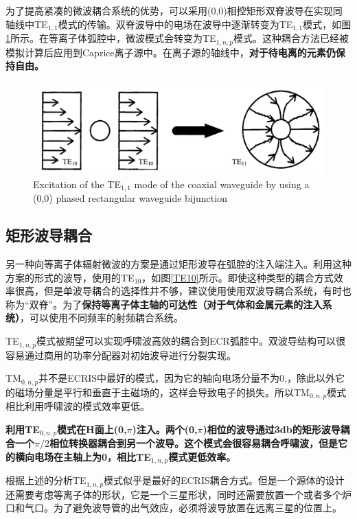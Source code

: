 \documentclass[fontset=windows]{article}
\begin{document}
为了提高紧凑的微波耦合系统的优势，可以采用(0,0)相控矩形双脊波导在实现同轴线中TE$_{1,1}$模式的传输。双脊波导中的电场在波导中逐渐转变为TE$_{1,1}$模式，如图\ref{Excitation-1}所示。在等离子体弧腔中，微波模式会转变为TE$_{1,n,p}$模式。这种耦合方法已经被模拟计算后应用到Caprice离子源中。在离子源的轴线中，\textbf{对于待电离的元素仍保持自由。}

\begin{figure}
    \centering
    \includegraphics{Excitation of.png}
    \caption{Excitation of the TE$_{1,1}$ mode of the coaxial waveguide by using a (0,0) phased
    rectangular waveguide bijunction}
    \label{Excitation-1}
\end{figure}

\subsection{矩形波导耦合}
另一种向等离子体辐射微波的方案是通过矩形波导在弧腔的注入端注入。利用这种方案的形式的波导，使用的TE$_{10}$，如图\ref{TE10}所示。即使这种类型的耦合方式效率很高，但是单波导耦合的选择性并不够，建议使用使用双波导耦合系统，有时也称为“双脊”。为了\textbf{保持等离子体主轴的可达性（对于气体和金属元素的注入系统）}，可以使用不同频率的射频耦合系统。

TE$_{1,n,p}$模式被期望可以实现呼啸波高效的耦合到ECR弧腔中。双波导结构可以很容易通过商用的功率分配器对初始波导进行分裂实现。

TM$_{0,n,p}$并不是ECRIS中最好的模式，因为它的轴向电场分量不为0,，除此以外它的磁场分量是平行和垂直于主磁场的，这样会导致电子的损失。所以TM$_{0,n,p}$模式相比利用呼啸波的模式效率更低。

\textbf{利用TE$_{0,n,p}$模式在H面上(0,$\pi$)注入。两个(0,$\pi$)相位的波导通过3db的矩形波导耦合一个$\pi /2$相位转换器耦合到另一个波导。这个模式会很容易耦合呼啸波，但是它的横向电场在主轴上为0，相比TE$_{1,n,p}$模式更低效率。}

根据上述的分析TE$_{1,n,p}$模式似乎是最好的ECRIS耦合方式。但是一个源体的设计还需要考虑等离子体的形状，它是一个三星形状，同时还需要放置一个或者多个炉口和气口。为了避免波导管的出气效应，必须将波导放置在远离三星的位置上。
\end{document}
